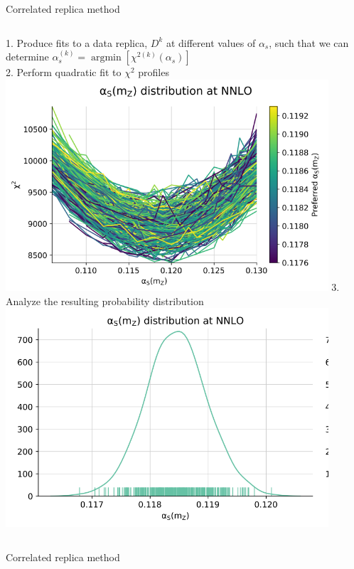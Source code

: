 \documentclass[aspectratio=169, 8pt,t]{beamer}
\begin{document}
\begin{frame}{Correlated replica method}
  \begin{columns}
    1. Produce fits to a data replica, $D^k$ at different values of $\alpha_s$, such that we can determine $\alpha_s^{(k)}=\operatorname{argmin}\left[\chi^{2(k)}\left(\alpha_s\right)\right]$ \\\vspace*{1em}
    2. Perform quadratic fit to $\chi^2$ profiles \\
    \includegraphics[width=0.9\textwidth]{figures/parabolaplotnnpdf31.png}
    3. Analyze the resulting probability distribution \\
    \includegraphics[width=0.9\textwidth]{figures/alphasnnpdf31result.png}
  \end{columns}


\end{frame}


\begin{frame}{Correlated replica method}






\end{frame}
\end{document}
